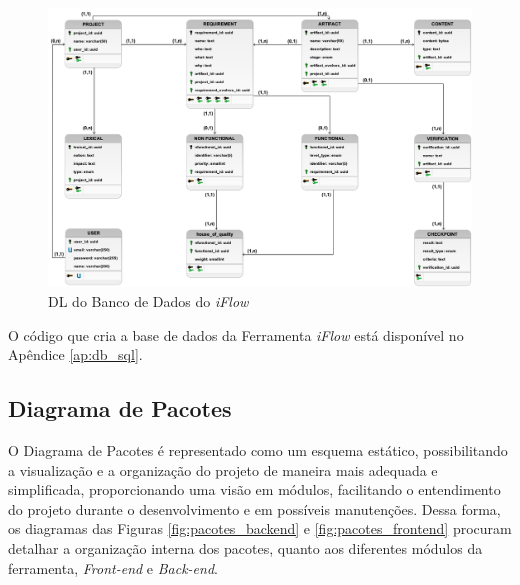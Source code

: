 \begin{figure}[H]
    \begin{center}
        \caption{{DL do Banco de Dados do \textit{iFlow}}}
        \label{fig:diagrama_logico}
        \includegraphics[scale=0.37]{figuras/Proposta/Lógico_iFlow.png}
    \end{center}
\end{figure}

O código que cria a base de dados da Ferramenta \textit{iFlow} está disponível no Apêndice \ref{ap:db_sql}.

\subsection{Diagrama de Pacotes}

O Diagrama de Pacotes é representado como um esquema estático, possibilitando a visualização e a organização do projeto de maneira mais adequada e simplificada, proporcionando uma visão em módulos, facilitando o entendimento do projeto durante o desenvolvimento e em possíveis manutenções. Dessa forma, os diagramas das Figuras \ref{fig:pacotes_backend} e \ref{fig:pacotes_frontend} procuram detalhar a organização interna dos pacotes, quanto aos diferentes módulos da ferramenta, \textit{Front-end} e \textit{Back-end}.

